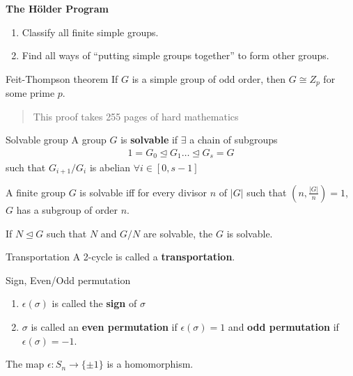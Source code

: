 \documentclass[titlepage, 12pt]{book}
\begin{document}
\begin{center}
    \large{\textbf{The H\"older Program}}
    \begin{enumerate}
        \item Classify all finite simple groups.
        \item Find all ways of ``putting simple groups together'' to form other
            groups.
    \end{enumerate}
\end{center}
\begin{theorem}{Feit-Thompson theorem}{}
    If $G$ is a simple group of odd order, then $G\cong Z_p$ for some prime
    $p$.
\end{theorem}
\begin{quotation}
This proof takes 255 pages of hard mathematics
\end{quotation}
\begin{definition}{Solvable group}{}
    A group $G$ is \textbf{solvable} if $\exists$ a chain of subgroups
    \begin{gather*}
        1 = G_0\trianglelefteq G_1\dots\trianglelefteq G_s = G
    \end{gather*}
    such that $G_{i+1}/G_i$ is abelian $\forall i\in[0, s - 1]$
\end{definition}
\begin{theorem}{}{}
    A finite group $G$ is solvable iff for every divisor $n$ of $|G|$ such that
    $(n, \frac{|G|}{n}) = 1$, $G$ has a subgroup of order $n$.
\end{theorem}
\begin{proposition}{}{}
    If $N\trianglelefteq G$ such that $N$ and $G/N$ are solvable, the $G$ is
    solvable.
\end{proposition}
\begin{definition}{Transportation}{}
    A 2-cycle is called a \textbf{transportation}.
\end{definition}
\begin{definition}{Sign, Even/Odd permutation}{}
    \begin{enumerate}
        \item $\epsilon(\sigma)$ is called the \textbf{sign} of $\sigma$
        \item $\sigma$ is called an \textbf{even permutation} if
            $\epsilon(\sigma) = 1$ and \textbf{odd permutation} if
            $\epsilon(\sigma) = -1$.
    \end{enumerate}
\end{definition}
\begin{proposition}{}{}
    The map $\epsilon:S_n\rightarrow\{\pm 1\}$ is a homomorphism.
\end{proposition}
\end{document}
